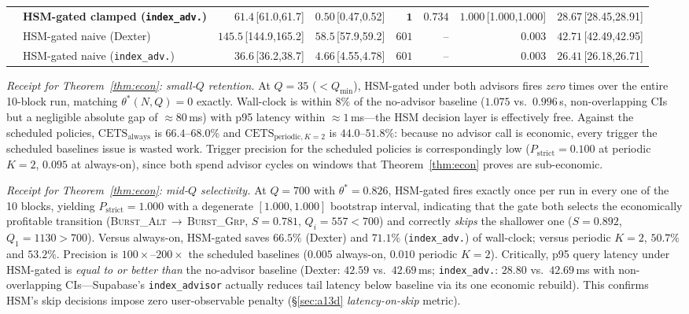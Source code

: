 \documentclass[10pt,journal,compsoc]{IEEEtran}
\newcommand{\thetastar}{\theta^{*}}
\begin{document}
\begin{table}[!htb]
{\begin{tabular}{@{}llrrrrrr@{}}
 & \textbf{HSM-gated clamped (\texttt{index\_adv.})}& $\mathbf{61.4}$\,{\tiny[61.0,61.7]} & $\mathbf{0.50}$\,{\tiny[0.47,0.52]} & $\mathbf{1}$ & $\mathbf{0.734}$ & $\mathbf{1.000}$\,{\tiny[1.000,1.000]} & $\mathbf{28.67}$\,{\tiny[28.45,28.91]} \\
 & HSM-gated naive (Dexter)                         & $145.5$\,{\tiny[144.9,165.2]}       & $58.5$\,{\tiny[57.9,59.2]}          & $601$        & --                & $0.003$                              & $42.71$\,{\tiny[42.49,42.95]} \\
 & HSM-gated naive (\texttt{index\_adv.})           & $36.6$\,{\tiny[36.2,38.7]}          & $4.66$\,{\tiny[4.55,4.78]}          & $601$        & --                & $0.003$                              & $26.41$\,{\tiny[26.18,26.71]} \\
\bottomrule
\end{tabular}}
\end{table}

\emph{Receipt for Theorem~\ref{thm:econ}: small-$Q$ retention.}
At $Q\!=\!35$ ($<\!Q_{\min}$), HSM-gated under both advisors fires
\emph{zero} times over the entire 10-block run, matching
$\thetastar(N,Q)\!=\!0$ exactly.  Wall-clock is within $8\%$ of the
no-advisor baseline ($1.075$ vs.\ $0.996$\,s, non-overlapping CIs but
a negligible absolute gap of $\approx\!80$\,ms) with p95 latency
within $\approx\!1$\,ms---the HSM decision layer is effectively free.
Against the scheduled policies, $\text{CETS}_{\mathrm{always}}$ is
$66.4$--$68.0\%$ and $\text{CETS}_{\mathrm{periodic},K=2}$ is
$44.0$--$51.8\%$: because no advisor call is economic, every trigger
the scheduled baselines issue is wasted work.  Trigger precision for
the scheduled policies is correspondingly low ($P_{\mathrm{strict}}
\!=\!0.100$ at periodic $K\!=\!2$, $0.095$ at always-on), since both
spend advisor cycles on windows that Theorem~\ref{thm:econ} proves
are sub-economic.

\emph{Receipt for Theorem~\ref{thm:econ}: mid-$Q$ selectivity.}
At $Q\!=\!700$ with $\thetastar\!=\!0.826$, HSM-gated fires exactly
once per run in every one of the 10 blocks, yielding
$P_{\mathrm{strict}}\!=\!1.000$ with a degenerate $[1.000,1.000]$
bootstrap interval, indicating that the gate both selects
the economically profitable transition
(\textsc{Burst\_Alt}\,$\to$\,\textsc{Burst\_Grp}, $S\!=\!0.781$,
$Q_i\!=\!557\!<\!700$) and correctly \emph{skips} the shallower one
($S\!=\!0.892$, $Q_1\!=\!1130\!>\!700$).  Versus always-on, HSM-gated
saves $66.5\%$ (Dexter) and $71.1\%$ (\texttt{index\_adv.}) of
wall-clock; versus periodic $K\!=\!2$, $50.7\%$ and $53.2\%$.
Precision is $100\times$--$200\times$ the scheduled baselines
($0.005$ always-on, $0.010$ periodic $K\!=\!2$).  Critically, p95
query latency under HSM-gated is \emph{equal to or better than} the
no-advisor baseline (Dexter: $42.59$ vs.\ $42.69$\,ms;
\texttt{index\_adv.}: $28.80$ vs.\ $42.69$\,ms with
non-overlapping CIs---Supabase's \texttt{index\_advisor} actually
reduces tail latency below baseline via its one economic rebuild).
This confirms HSM's skip decisions impose zero user-observable
penalty (\S\ref{sec:a13d} \emph{latency-on-skip} metric).
\end{document}
